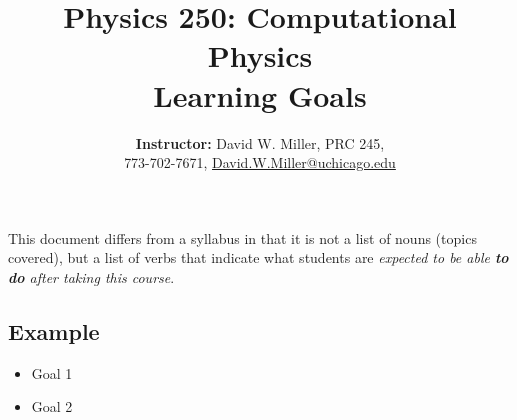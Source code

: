 \documentclass[12pt]{article}
\title{\sc Physics 250: Computational Physics\\Learning Goals}
\author{\textbf{Instructor:} David W. Miller, PRC 245, \\ 773-702-7671, \href{mailto:David.W.Miller@uchicago.edu}{David.W.Miller@uchicago.edu}}
\date{}
\begin{document}
\maketitle

\thispagestyle{fancy}


\noindent This document differs from a syllabus in that it is not a list of nouns (topics covered), but a list of verbs that indicate what students are \textit{expected to be able \textbf{to do} after taking this course}.

\subsection*{Example}

\begin{itemize}
  \item Goal 1
  \item Goal 2
\end{itemize}
\end{document}
